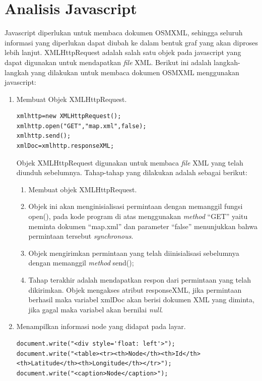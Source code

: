 \section{Analisis Javascript} \label{ssec:analisis_js}
Javascript diperlukan untuk membaca dokumen OSMXML, sehingga seluruh informasi
yang diperlukan dapat diubah ke dalam bentuk graf yang akan diproses lebih lanjut.
XMLHttpRequest adalah salah satu objek pada javascript yang dapat digunakan 
untuk mendapatkan \textit{file} XML. Berikut ini adalah langkah-langkah yang
dilakukan untuk membaca dokumen OSMXML menggunakan javascript:
\begin{enumerate}
  \item Membuat Objek XMLHttpRequest. 
\begin{verbatim}
xmlhttp=new XMLHttpRequest();
xmlhttp.open("GET","map.xml",false);
xmlhttp.send();
xmlDoc=xmlhttp.responseXML;
\end{verbatim}
Objek XMLHttpRequest digunakan untuk membaca \textit{file} XML yang telah
diunduh sebelumnya. Tahap-tahap yang dilakukan adalah sebagai berikut:
\begin{enumerate}
  \item Membuat objek XMLHttpRequest.
  
  \item Objek ini akan menginisialisasi permintaan dengan memanggil fungsi
  open(), pada kode program di atas menggunakan \textit{method} ``GET'' yaitu meminta dokumen ``map.xml'' 
  dan parameter ``false'' menunjukkan bahwa permintaan tersebut \textit{synchronous}.
  
  \item Objek mengirimkan permintaan yang telah diinisialisasi sebelumnya dengan
  memanggil \textit{method} send();
  
  \item Tahap terakhir adalah mendapatkan respon dari permintaan yang telah
  dikirimkan. Objek mengakses atribut responseXML, jika permintaan berhasil
  maka variabel xmlDoc akan berisi dokumen XML yang diminta, jika gagal maka
  variabel akan bernilai \textit{null}.
\end{enumerate}

  \item Menampilkan informasi node yang didapat pada layar.
\begin{verbatim}
document.write("<div style='float: left'>");
document.write("<table><tr><th>Node</th><th>Id</th>
<th>Latitude</th><th>Longitude</th></tr>");
document.write("<caption>Node</caption>");


\end{verbatim}
\end{enumerate}
